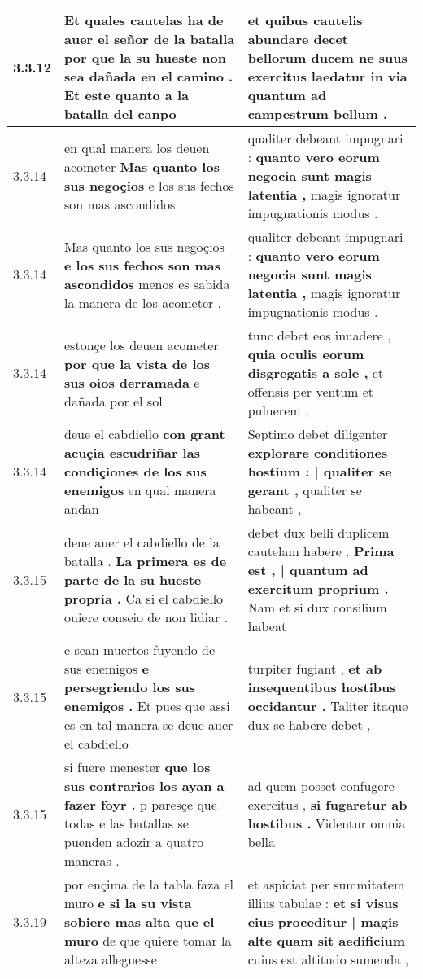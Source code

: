 \begin{tabular}{|p{1cm}|p{6.5cm}|p{6.5cm}|}
3.3.12 & Et quales cautelas ha de auer el señor de la batalla \textbf{ por que la su hueste non sea dañada en el camino . } Et este quanto a la batalla del canpo & et quibus cautelis abundare decet bellorum ducem \textbf{ ne suus exercitus laedatur } in via quantum ad campestrum bellum . \\\hline
3.3.14 & en qual manera los deuen acometer \textbf{ Mas quanto los sus negoçios } e los sus fechos son mas ascondidos & qualiter debeant impugnari : \textbf{ quanto vero eorum negocia sunt magis latentia , } magis ignoratur impugnationis modus . \\\hline
3.3.14 & Mas quanto los sus negoçios \textbf{ e los sus fechos son mas ascondidos } menos es sabida la manera de los acometer . & qualiter debeant impugnari : \textbf{ quanto vero eorum negocia sunt magis latentia , } magis ignoratur impugnationis modus . \\\hline
3.3.14 & estonçe los deuen acometer \textbf{ por que la vista de los sus oios derramada } e dañada por el sol & tunc debet eos inuadere , \textbf{ quia oculis eorum disgregatis a sole , } et offensis per ventum et puluerem , \\\hline
3.3.14 & deue el cabdiello \textbf{ con grant acuçia escudriñar las condiçiones de los sus enemigos } en qual manera andan & Septimo debet diligenter \textbf{ explorare conditiones hostium : | qualiter se gerant , } qualiter se habeant , \\\hline
3.3.15 & deue auer el cabdiello de la batalla . \textbf{ La primera es de parte de la su hueste propria . } Ca si el cabdiello ouiere conseio de non lidiar . & debet dux belli duplicem cautelam habere . \textbf{ Prima est , | quantum ad exercitum proprium . } Nam et si dux consilium habeat \\\hline
3.3.15 & e sean muertos fuyendo de sus enemigos \textbf{ e persegriendo los sus enemigos . } Et pues que assi es en tal manera se deue auer el cabdiello & turpiter fugiant , \textbf{ et ab insequentibus hostibus occidantur . } Taliter itaque dux se habere debet , \\\hline
3.3.15 & si fuere menester \textbf{ que los sus contrarios los ayan a fazer foyr . } p paresçe que todas e las batallas se puenden adozir a quatro maneras . & ad quem posset confugere exercitus , \textbf{ si fugaretur ab hostibus . } Videntur omnia bella \\\hline
3.3.19 & por ençima de la tabla faza el muro \textbf{ e si la su vista sobiere mas alta que el muro } de que quiere tomar la alteza alleguesse & et aspiciat per summitatem illius tabulae : \textbf{ et si visus eius proceditur | magis alte quam sit aedificium } cuius est altitudo sumenda , \\\hline

\end{tabular}
